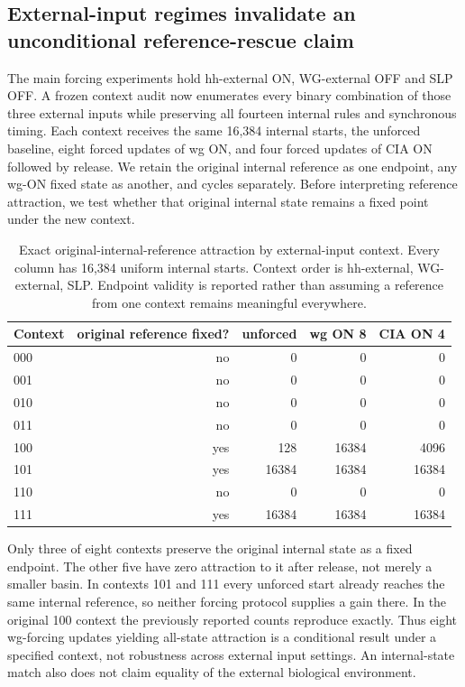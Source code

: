 \subsection{External-input regimes invalidate an unconditional reference-rescue claim}
The main forcing experiments hold hh-external ON, WG-external OFF and SLP OFF. A frozen context audit now enumerates every binary combination of those three external inputs while preserving all fourteen internal rules and synchronous timing. Each context receives the same 16,384 internal starts, the unforced baseline, eight forced updates of wg ON, and four forced updates of CIA ON followed by release. We retain the original internal reference as one endpoint, any wg-ON fixed state as another, and cycles separately. Before interpreting reference attraction, we test whether that original internal state remains a fixed point under the new context.
\begin{table}[ht]\centering
\caption{Exact original-internal-reference attraction by external-input context. Every column has 16,384 uniform internal starts. Context order is hh-external, WG-external, SLP. Endpoint validity is reported rather than assuming a reference from one context remains meaningful everywhere.}
\begin{tabular}{lrrrr}\hline
Context & original reference fixed? & unforced & wg ON 8 & CIA ON 4\\\hline
000 & no &0&0&0\\
001 & no &0&0&0\\
010 & no &0&0&0\\
011 & no &0&0&0\\
100 & yes &128&16384&4096\\
101 & yes &16384&16384&16384\\
110 & no &0&0&0\\
111 & yes &16384&16384&16384\\\hline
\end{tabular}\end{table}
Only three of eight contexts preserve the original internal state as a fixed endpoint. The other five have zero attraction to it after release, not merely a smaller basin. In contexts 101 and 111 every unforced start already reaches the same internal reference, so neither forcing protocol supplies a gain there. In the original 100 context the previously reported counts reproduce exactly. Thus eight wg-forcing updates yielding all-state attraction is a conditional result under a specified context, not robustness across external input settings. An internal-state match also does not claim equality of the external biological environment.

